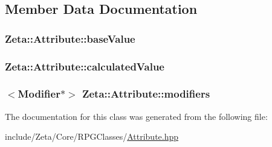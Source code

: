 \subsection{Member Data Documentation}
\hypertarget{classZeta_1_1Attribute_ab96690c561ec9b78648dafc70bc37529}{
\subsubsection[{base\+Value}]{ Zeta\+::\+Attribute\+::base\+Value\hspace{0.3cm}{\ttfamily [protected]}}}\label{classZeta_1_1Attribute_ab96690c561ec9b78648dafc70bc37529}
\hypertarget{classZeta_1_1Attribute_a76b3de0b3f4037ed5c19d3da82f105d8}{
\subsubsection[{calculated\+Value}]{ Zeta\+::\+Attribute\+::calculated\+Value\hspace{0.3cm}{\ttfamily [protected]}}}\label{classZeta_1_1Attribute_a76b3de0b3f4037ed5c19d3da82f105d8}
\hypertarget{classZeta_1_1Attribute_a340f14d134cb26bf1c8685df3199ffcb}{
\subsubsection[{modifiers}]{$<${\bf Modifier}$\ast$$>$ Zeta\+::\+Attribute\+::modifiers\hspace{0.3cm}{\ttfamily [protected]}}}\label{classZeta_1_1Attribute_a340f14d134cb26bf1c8685df3199ffcb}


The documentation for this class was generated from the following file\+:\begin{DoxyCompactItemize}
\item 
include/\+Zeta/\+Core/\+R\+P\+G\+Classes/\hyperlink{Attribute_8hpp}{Attribute.\+hpp}\end{DoxyCompactItemize}
